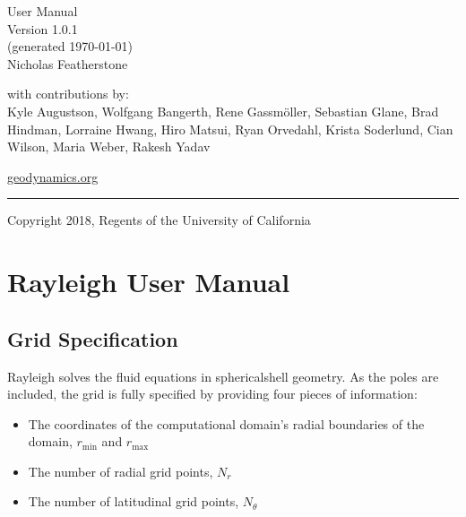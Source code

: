 \documentclass[letterpaper,11pt,english]{sphinxmanual}
\begin{document}
{%
\color{dark_grey}
\vspace{0.5in}
\hfill{\Huge \fontfamily{\sfdefault}\selectfont User Manual \\
\raggedleft \huge \fontfamily{\sfdefault}\selectfont Version
1.0.1
\\\large(generated \today)\\
{\Large Nicholas Featherstone\\}
}
\null
\vspace{17em}
\color{dark_grey}
{\fontfamily{\sfdefault}\selectfont
\large
\vspace{0.3in}
\noindent with contributions by: \\
    Kyle Augustson, Wolfgang Bangerth, Rene Gassm\"oller, Sebastian Glane, Brad Hindman, Lorraine Hwang, Hiro Matsui, Ryan Orvedahl, Krista Soderlund, Cian Wilson, Maria Weber, Rakesh Yadav
    \\
\vspace{1.0em}

{\noindent
{\href{https://geodynamics.org}{geodynamics.org}}
}
}


{\noindent
\color{dark_grey}
\rule{\textwidth}{2pt}
}

\vspace{-1.5em}
\textcopyright Copyright 2018, Regents of the University of California

}

\pagebreak

\pagestyle{plain}
\sphinxtableofcontents
\pagestyle{normal}
\label{\detokenize{index::doc}}



\chapter{Rayleigh User Manual}
\label{\detokenize{doc/source/Model_Setup/index:rayleigh-user-manual}}\label{\detokenize{doc/source/Model_Setup/index::doc}}

\section{Grid Specification}
\label{\detokenize{doc/source/Model_Setup/grid_specification:grid-specification}}\label{\detokenize{doc/source/Model_Setup/grid_specification::doc}}
\sphinxAtStartPar
Rayleigh solves the fluid equations in spherical\sphinxhyphen{}shell geometry.  As the poles are included, the grid is fully specified by providing four pieces of information:
\begin{itemize}
\item {} 
\sphinxAtStartPar
The coordinates of the computational domain’s radial boundaries of the domain, \(r_\mathrm{min}\) and \(r_\mathrm{max}\)

\item {} 
\sphinxAtStartPar
The number of radial grid points, \(N_r\)

\item {} 
\sphinxAtStartPar
The number of latitudinal grid points, \(N_\theta\)

\end{itemize}
\end{document}
